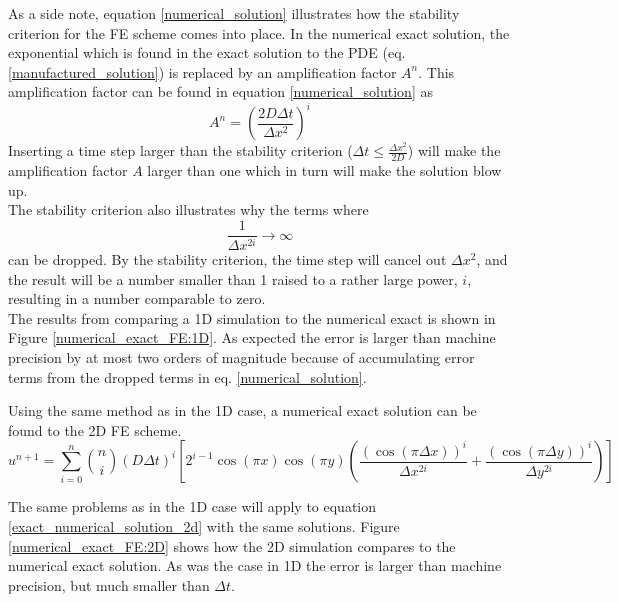 As a side note, equation \eqref{numerical_solution} illustrates how the stability criterion for the FE scheme comes into place. 
In the numerical exact solution, the exponential which is found in the exact solution to the PDE (eq. \ref{manufactured_solution}) is replaced by an amplification factor $A^n$.
This amplification factor can be found in equation \eqref{numerical_solution} as 
\begin{equation}
A^n = \left(\frac{2D\Delta t}{\Delta x^2}\right)^i
\end{equation}
Inserting a time step larger than the stability criterion ($\Delta t \leq \frac{\Delta x^2}{2D}$) will make the amplification factor $A$ larger than one which in turn will make the solution blow up. \\
The stability criterion also illustrates why the terms where 
$$ \frac{1}{\Delta x^{2i}} \to \infty$$
 can be dropped. 
 By the stability criterion, the time step will cancel out $\Delta x^2$, and the result will be a number smaller than 1 raised to a rather large power, $i$, resulting in a number comparable to zero.\\
 
 The results from comparing a 1D simulation to the numerical exact is shown in Figure \ref{numerical_exact_FE:1D}. 
 As expected the error is larger than machine precision by at most two orders of magnitude because of accumulating error terms from the dropped terms in eq. \eqref{numerical_solution}.
 
 Using the same method as in the 1D case, a numerical exact solution can be found to the 2D FE scheme. 
 \begin{equation}\label{exact_numerical_solution_2d}
 u^{n+1} = \sum\limits^n_{i=0}{n\choose i}\left(D\Delta t\right)^i\left[2^{i-1}\cos(\pi x)\cos(\pi y)\left(\frac{(\cos(\pi\Delta x))^i}{\Delta x^{2i}} +\frac{(\cos(\pi\Delta y))^i}{\Delta y^{2i}}\right)\right]
\end{equation}

The same problems as in the 1D case will apply to equation \eqref{exact_numerical_solution_2d} with the same solutions. 
Figure \ref{numerical_exact_FE:2D} shows how the 2D simulation compares to the numerical exact solution. 
As was the case in 1D the error is larger than machine precision, but much smaller than $\Delta t$.

